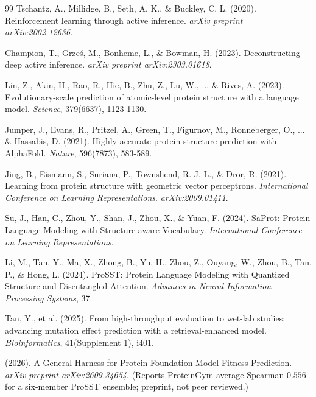 \documentclass[12pt, a4paper]{article}
\begin{document}
\begin{thebibliography}{99}
Tschantz, A., Millidge, B., Seth, A. K., \& Buckley, C. L. (2020). \newblock Reinforcement learning through active inference. \newblock \textit{arXiv preprint arXiv:2002.12636}.


Champion, T., Grze\'{s}, M., Bonheme, L., \& Bowman, H. (2023). \newblock Deconstructing deep active inference. \newblock \textit{arXiv preprint arXiv:2303.01618}.


Lin, Z., Akin, H., Rao, R., Hie, B., Zhu, Z., Lu, W., ... \& Rives, A. (2023). \newblock Evolutionary-scale prediction of atomic-level protein structure with a language model. \newblock \textit{Science}, 379(6637), 1123-1130.


Jumper, J., Evans, R., Pritzel, A., Green, T., Figurnov, M., Ronneberger, O., ... \& Hassabis, D. (2021). \newblock Highly accurate protein structure prediction with AlphaFold. \newblock \textit{Nature}, 596(7873), 583-589.


Jing, B., Eismann, S., Suriana, P., Townshend, R. J. L., \& Dror, R. (2021). \newblock Learning from protein structure with geometric vector perceptrons. \newblock \textit{International Conference on Learning Representations}. \textit{arXiv:2009.01411}.


Su, J., Han, C., Zhou, Y., Shan, J., Zhou, X., \& Yuan, F. (2024). \newblock SaProt: Protein Language Modeling with Structure-aware Vocabulary. \newblock \textit{International Conference on Learning Representations}.


Li, M., Tan, Y., Ma, X., Zhong, B., Yu, H., Zhou, Z., Ouyang, W., Zhou, B., Tan, P., \& Hong, L. (2024). \newblock ProSST: Protein Language Modeling with Quantized Structure and Disentangled Attention. \newblock \textit{Advances in Neural Information Processing Systems}, 37.


Tan, Y., et al. (2025). \newblock From high-throughput evaluation to wet-lab studies: advancing mutation effect prediction with a retrieval-enhanced model. \newblock \textit{Bioinformatics}, 41(Supplement 1), i401.


(2026). \newblock A General Harness for Protein Foundation Model Fitness Prediction. \newblock \textit{arXiv preprint arXiv:2609.34654}. (Reports ProteinGym average Spearman $0.556$ for a six-member ProSST ensemble; preprint, not peer reviewed.)



\end{thebibliography}
\end{document}
